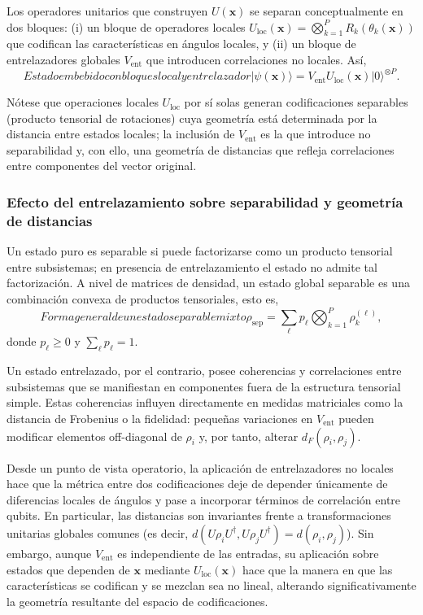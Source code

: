 Los operadores unitarios que construyen $U(\mathbf{x})$ se separan conceptualmente en dos bloques: (i) un bloque de operadores locales $U_{\mathrm{loc}}(\mathbf{x})=\bigotimes_{k=1}^P R_k(\theta_k(\mathbf{x}))$ que codifican las características en ángulos locales, y (ii) un bloque de entrelazadores globales $V_{\mathrm{ent}}$ que introducen correlaciones no locales. Así,
\begin{equation}[eq:estado_feature_map_entrelazado]{Estado embebido con bloques local y entrelazador}
\lvert\psi(\mathbf{x})\rangle = V_{\mathrm{ent}} U_{\mathrm{loc}}(\mathbf{x})\lvert 0\rangle^{\otimes P}.
\end{equation}

Nótese que operaciones locales $U_{\mathrm{loc}}$ por sí solas generan codificaciones separables (producto tensorial de rotaciones) cuya geometría está determinada por la distancia entre estados locales; la inclusión de $V_{\mathrm{ent}}$ es la que introduce no separabilidad y, con ello, una geometría de distancias que refleja correlaciones entre componentes del vector original.

\subsubsection{Efecto del entrelazamiento sobre separabilidad y geometría de distancias}

Un estado puro es separable si puede factorizarse como un producto tensorial entre subsistemas; en presencia de entrelazamiento el estado no admite tal factorización. A nivel de matrices de densidad, un estado global separable es una combinación convexa de productos tensoriales, esto es,
\begin{equation}[eq:estado_separable_mixto]{Forma general de un estado separable mixto}
\rho_{\mathrm{sep}} = \sum_{\ell} p_{\ell} \bigotimes_{k=1}^P \rho_k^{(\ell)},
\end{equation}
donde $p_{\ell}\geq 0$ y $\sum_{\ell}p_{\ell}=1$.

Un estado entrelazado, por el contrario, posee coherencias y correlaciones entre subsistemas que se manifiestan en componentes fuera de la estructura tensorial simple. Estas coherencias influyen directamente en medidas matriciales como la distancia de Frobenius o la fidelidad: pequeñas variaciones en $V_{\mathrm{ent}}$ pueden modificar elementos off-diagonal de $\rho_i$ y, por tanto, alterar $d_F(\rho_i,\rho_j)$.

Desde un punto de vista operatorio, la aplicación de entrelazadores no locales hace que la métrica entre dos codificaciones deje de depender únicamente de diferencias locales de ángulos y pase a incorporar términos de correlación entre qubits. En particular, las distancias son invariantes frente a transformaciones unitarias globales comunes (es decir, $d(U\rho_i U^{\dagger}, U\rho_j U^{\dagger})=d(\rho_i,\rho_j)$). Sin embargo, aunque $V_{\mathrm{ent}}$ es independiente de las entradas, su aplicación sobre estados que dependen de $\mathbf{x}$ mediante $U_{\mathrm{loc}}(\mathbf{x})$ hace que la manera en que las características se codifican y se mezclan sea no lineal, alterando significativamente la geometría resultante del espacio de codificaciones.

